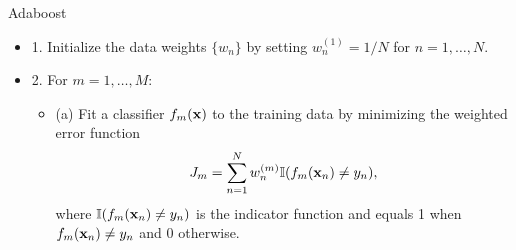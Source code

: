 \documentclass{beamer}
\def\bfx{{\bf x}}
\begin{document}
                     \begin{frame}{Adaboost}%
                     \begin{itemize}
                     \item 1. Initialize the data weights $\{w_n\}$ by setting $w_n^{(1)}= 1/N$ for $n=1,\dots,N$.
                     \item 2. For $m=1,\dots,M$:
                     \begin{itemize}
                      \item (a) Fit a classifier $f_m(\bfx)$ to the training data by minimizing the weighted error function
                        \begin{align}  \label{Jm}
                        J_m = \sum^N_{n=1}w_n^{(m)} \mathbb{I}(f_m(\bfx_n)\ne y_n),
                        \end{align}
                      where $\mathbb{I}(f_m(\bfx_n)\ne y_n)$ is the indicator function and equals 1 when $f_m(\bfx_n)\ne y_n$ and 0 otherwise.
                     \end{itemize}
                     \end{itemize}
                     \end{frame}
\end{document}
